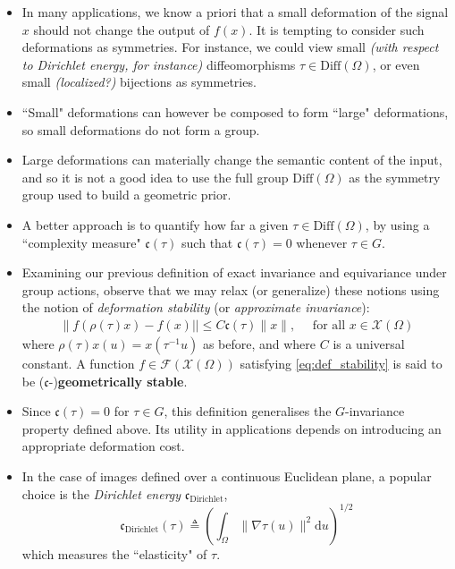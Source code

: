 \documentclass[12pt]{article}
\numberwithin{equation}{section}
\theoremstyle{definition}
\newcommand{		\1		}	{	\bm{1}					}%
\begin{document}
\begin{itemize}

\item In many applications, we know a priori that a small deformation of the signal $x$ should not change the output of $f(x)$. It is tempting to consider such deformations as symmetries. For instance, we could view small \emph{(with respect to Dirichlet energy, for instance)} diffeomorphisms $\tau \in \textrm{Diff}(\Omega)$, or even small \emph{(localized?)} bijections as symmetries. 

\item ``Small" deformations can however be composed to form ``large" deformations, so small deformations do not form a group. 

\item Large deformations can materially change the semantic content of the input, and so it is not a good idea to use the full group $\textrm{Diff}(\Omega)$ as the symmetry group used to build a geometric prior. 

\item A better approach is to quantify how far a given $\tau \in \textrm{Diff}(\Omega)$, by using a ``complexity measure" $\mathfrak{c}(\tau)$ such that $\mathfrak{c}(\tau) = 0$ whenever $\tau \in G$. 

\item Examining our previous definition of exact invariance and equivariance under group actions, observe that we may relax (or generalize) these notions using the notion of \emph{deformation stability} (or \emph{approximate invariance}):
    \begin{align}
    \label{eq:def_stability}
    \| f ( \rho(\tau) x ) - f(x) || \leq C \mathfrak{c}(\tau) \| x\| , \quad \text{ for all } x \in \mathcal{X}(\Omega)
    \end{align}
    where $\rho(\tau) x(u) = x(\tau^{-1}u )$ as before, and where $C$ is a universal constant. A function $f \in \mathcal{F}(\mathcal{X}(\Omega) )$ satisfying \eqref{eq:def_stability} is said to be ($\mathfrak{c}$-)\textbf{geometrically stable}. 
    
\item Since $\mathfrak{c}(\tau) = 0$ for $\tau \in G$, this definition generalises the $G$-invariance property defined above. Its utility in applications depends on introducing an appropriate deformation cost. 

\item In the case of images defined over a continuous Euclidean plane, a popular choice is the \emph{Dirichlet energy} $\mathfrak{c}_{\textrm{Dirichlet}}$, 
    $$
    \mathfrak{c}_{\textrm{Dirichlet}}(\tau) \triangleq \left( \int_\Omega \| \nabla \tau(u) \| ^2 \textrm{d} u \right)^{1/2}
    $$
    which measures the ``elasticity" of $\tau$. 
\end{itemize}
\end{document}
